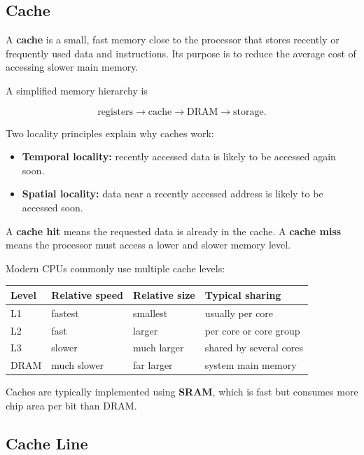 \documentclass[11pt,a4paper]{article}
\begin{document}
\subsection{Cache}

A \textbf{cache} is a small, fast memory close to the processor that stores recently or frequently used data and instructions. Its purpose is to reduce the average cost of accessing slower main memory.

A simplified memory hierarchy is

\[
\text{registers}
\rightarrow
\text{cache}
\rightarrow
\text{DRAM}
\rightarrow
\text{storage}.
\]

Two locality principles explain why caches work:

\begin{itemize}
    \item \textbf{Temporal locality:} recently accessed data is likely to be accessed again soon.
    \item \textbf{Spatial locality:} data near a recently accessed address is likely to be accessed soon.
\end{itemize}

A \textbf{cache hit} means the requested data is already in the cache. A \textbf{cache miss} means the processor must access a lower and slower memory level.

Modern CPUs commonly use multiple cache levels:

\begin{center}
\begin{tabular}{llll}
\toprule
Level & Relative speed & Relative size & Typical sharing \\
\midrule
L1 & fastest & smallest & usually per core \\
L2 & fast & larger & per core or core group \\
L3 & slower & much larger & shared by several cores \\
DRAM & much slower & far larger & system main memory \\
\bottomrule
\end{tabular}
\end{center}

Caches are typically implemented using \textbf{SRAM}, which is fast but consumes more chip area per bit than DRAM.

\subsection{Cache Line}
\end{document}
